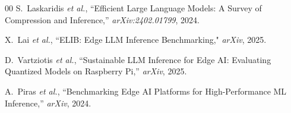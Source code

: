 \documentclass[conference]{IEEEtran}
\begin{document}
\begin{thebibliography}{00}
S.~Laskaridis \textit{et al.}, ``Efficient Large Language Models: A
Survey of Compression and Inference,'' \textit{arXiv:2402.01799}, 2024.

X.~Lai \textit{et al.}, ``ELIB: Edge LLM Inference Benchmarking,"
\textit{arXiv}, 2025.

D.~Vartziotis \textit{et al.}, ``Sustainable LLM Inference for Edge
AI: Evaluating Quantized Models on Raspberry Pi,''
\textit{arXiv}, 2025.

A.~Piras \textit{et al.}, ``Benchmarking Edge AI Platforms for
High-Performance ML Inference,'' \textit{arXiv}, 2024.

\end{thebibliography}
\end{document}
